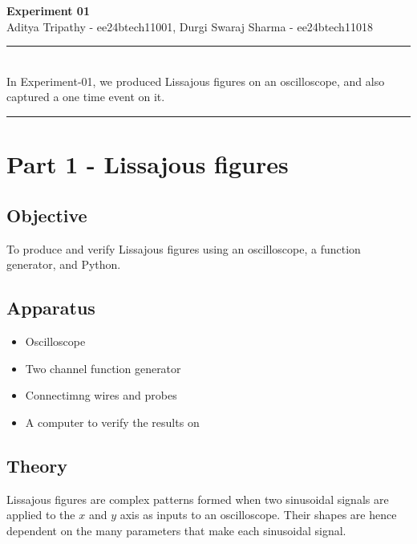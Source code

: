 \documentclass[a4paper,12pt]{article}
\renewenvironment{abstract}
 {\par\noindent\textbf{\abstractname}\ \ignorespaces \\}
 {\par\noindent\medskip}
\begin{document}
\pagestyle{fancy}
\thispagestyle{empty}
\fancyhead[L]{}
\renewcommand*{\thefootnote}{\fnsymbol{footnote}}
\begin{center}
\Large{\textbf{Experiment 01}}
\vspace{0.4cm}
\normalsize
\\ Aditya Tripathy - ee24btech11001, Durgi Swaraj Sharma - ee24btech11018\\
\medskip
\normalsize
\end{center}
{\color{gray}\hrule}
\vspace{0.4cm}
\begin{abstract}
In Experiment-01, we produced Lissajous figures on an oscilloscope, and also captured a one time event on it.
\end{abstract}
{\color{gray}\hrule}
\medskip
\section{Part 1 - Lissajous figures}
\subsection{Objective}
To produce and verify Lissajous figures using an oscilloscope, a function generator, and Python.
\subsection{Apparatus}
\begin{itemize}
\item Oscilloscope
\item Two channel function generator
\item Connectimng wires and probes
\item A computer to verify the results on
\end{itemize}
\subsection{Theory}
Lissajous figures are complex patterns formed when two sinusoidal signals are applied to the $x$ and $y$ axis as inputs to an oscilloscope.
Their shapes are hence dependent on the many parameters that make each sinusoidal signal.
\end{document}
